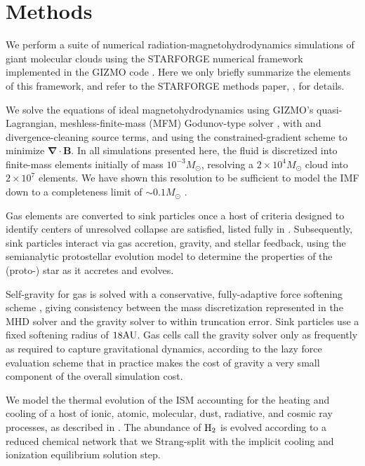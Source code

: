 \documentclass[apjl,twocolumn]{openjournal}
\begin{document}
\section{Methods}
We perform a suite of numerical radiation-magnetohydrodynamics simulations of giant molecular clouds using the \small{STARFORGE} numerical framework implemented in the \small{GIZMO} code \citep{hopkins:gizmo}. Here we only briefly summarize the elements of this framework, and refer to the \small{STARFORGE} methods paper, \citet{starforge.methods}, for details.

We solve the equations of ideal magnetohydrodynamics using \small{GIZMO}'s quasi-Lagrangian, meshless-finite-mass (MFM) Godunov-type solver \citep{hopkins:gizmo.mhd}, with \citep{powell1999} and \citep{dedner2002} divergence-cleaning source terms, and using the \citet{hopkins:gizmo.mhd.cg} constrained-gradient scheme to minimize $\mathbf{\nabla} \cdot \mathbf{B}$. In all simulations presented here, the fluid is discretized into finite-mass elements initially of mass $10^{-3}M_\odot$, resolving a $2\times 10^4 M_\odot$ cloud into $2\times 10^7$ elements. We have shown this resolution to be sufficient to model the IMF down to a completeness limit of $\sim 0.1 M_\odot$ \citep{starforge.methods}.

Gas elements are converted to sink particles once a host of criteria designed to identify centers of unresolved collapse are satisfied, listed fully in \citet{starforge.methods}. Subsequently, sink particles interact via gas accretion, gravity, and stellar feedback, using the \citet{Offner_2009_radiative_sim} semianalytic protostellar evolution model to determine the properties of the (proto-) star as it accretes and evolves.

Self-gravity for gas is solved with a conservative, fully-adaptive force softening scheme \citep{price_2007_adaptive_softening,hopkins:2023.adaptive.softening}, giving consistency between the mass discretization represented in the MHD solver and the gravity solver to within truncation error. Sink particles use a fixed softening radius of $18 \rm AU$. Gas cells call the gravity solver only as frequently as required to capture gravitational dynamics, according to the \citet{grudic:2021.adaptive} lazy force evaluation scheme that in practice makes the cost of gravity a very small component of the overall simulation cost.

We model the thermal evolution of the ISM accounting for the heating and cooling of a host of ionic, atomic, molecular, dust, radiative, and cosmic ray processes, as described in \citet{fire3}. The abundance of $\rm H_2$ is evolved according to a reduced chemical network that we Strang-split with the implicit cooling and ionization equilibrium solution step.
\end{document}
